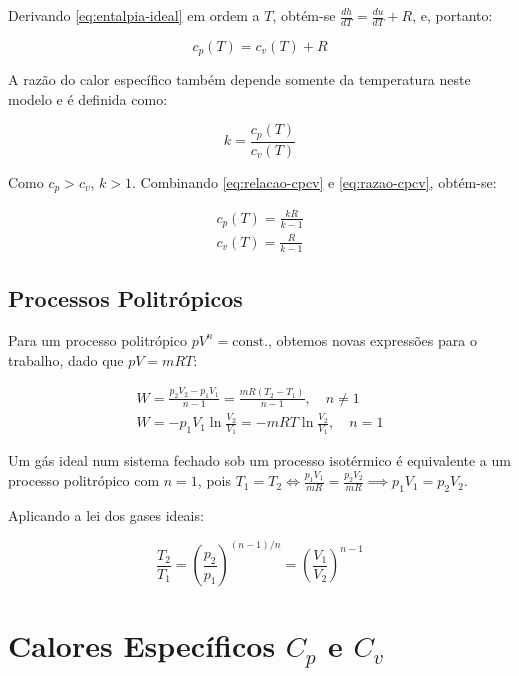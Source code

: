 Derivando \ref{eq:entalpia-ideal} em ordem a $T$, obtém-se $\frac{dh}{dT} = \frac{du}{dT} + R$, e, portanto:

\begin{equation} \label{eq:relacao-cpcv}
    c_p(T) = c_v(T) + R
\end{equation}

A razão do calor específico também depende somente da temperatura neste modelo e é definida como:

\begin{equation} \label{eq:razao-cpcv}
    k = \frac{c_p(T)}{c_v(T)}
\end{equation}

Como $c_p > c_v$, $k>1$. Combinando \ref{eq:relacao-cpcv} e \ref{eq:razao-cpcv}, obtém-se:

\begin{eqnarray}
    c_p(T) = \frac{k R}{k -1} \\
    c_v(T) = \frac{R}{k -1}
\end{eqnarray}

\subsection{Processos Politrópicos}

Para um processo politrópico $pV^n = \text{const.}$, obtemos novas expressões para o trabalho, dado que $pV = mRT$:

\begin{eqnarray}
    W = \frac{p_2 V_2 - p_1 V_1}{n - 1} = \frac{mR (T_2 - T_1)}{n - 1}, \quad n \neq 1 \\
    W = - p_1 V_1 \ln \frac{V_2}{V_1} = - mRT \ln \frac{V_2}{V_1}, \quad n = 1 \label{eq:trabalho-gas-ideal}
\end{eqnarray}

Um gás ideal num sistema fechado sob um processo isotérmico é equivalente a um processo politrópico com $n=1$, pois $T_1 = T_2 \Longleftrightarrow \frac{p_1 V_1}{mR} = \frac{p_2 V_2}{mR} \implies p_1 V_1 = p_2 V_2$.

Aplicando a lei dos gases ideais:

\begin{equation}
    \frac{T_2}{T_1} = \left( \frac{p_2}{p_1} \right)^{(n-1)/n} = \left( \frac{V_1}{V_2} \right)^{n-1}
\end{equation}

\section[Calores Específicos Cp e Cv]{Calores Específicos $C_p$ e $C_v$}

